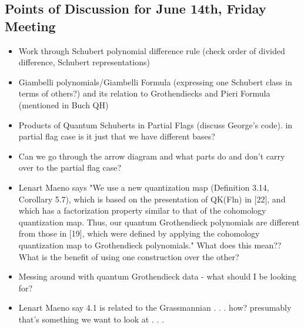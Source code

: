 \subsection{Points of Discussion for June 14th, Friday Meeting}

\begin{itemize}
    \item Work through Schubert polynomial difference rule (check order of divided difference, Schubert representations)
    \item Giambelli polynomials/Giambelli Formula (expressing one Schubert class in terms of others?) and its relation to Grothendiecks and Pieri Formula (mentioned in Buch QH)
    \item Products of Quantum Schuberts in Partial Flags (discuss George's code). in partial flag case is it just that we have different bases?
    \item Can we go through the arrow diagram and what parts do and don't carry over to the partial flag case?
    \item Lenart Maeno says "We use
a new quantization map (Definition 3.14, Corollary 5.7), which is based on the presentation of QK(Fln)
in [22], and which has a factorization property similar to that of the cohomology quantization map. Thus, our quantum Grothendieck polynomials are different from those in [19], which were defined by
applying the cohomology quantization map to Grothendieck polynomials." What does this mean?? What is the benefit of using one construction over the other?
\item Messing around with quantum Grothendieck data - what should I be looking for?
\item Lenart Maeno say 4.1 is related to the Grassmannian . . . how? presumably that's something we want to look at . . . 
\end{itemize}

